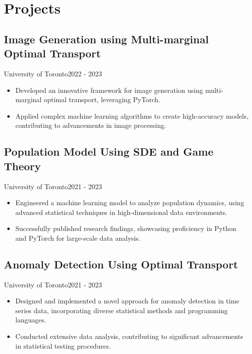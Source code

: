\section{Projects}
\subsection{Image Generation using Multi-marginal Optimal Transport}{University of Toronto}{2022 - 2023}
\begin{itemize}[leftmargin=*]
    \item Developed an innovative framework for image generation using multi-marginal optimal transport, leveraging PyTorch.
    \item Applied complex machine learning algorithms to create high-accuracy models, contributing to advancements in image processing.
\end{itemize}
\subsection{Population Model Using SDE and Game Theory}{University of Toronto}{2021 - 2023}
\begin{itemize}[leftmargin=*]
    \item Engineered a machine learning model to analyze population dynamics, using advanced statistical techniques in high-dimensional data environments.
    \item Successfully published research findings, showcasing proficiency in Python and PyTorch for large-scale data analysis.
\end{itemize}
\subsection{Anomaly Detection Using Optimal Transport}{University of Toronto}{2021 - 2023}
\begin{itemize}[leftmargin=*]
    \item Designed and implemented a novel approach for anomaly detection in time series data, incorporating diverse statistical methods and programming languages.
    \item Conducted extensive data analysis, contributing to significant advancements in statistical testing procedures.
\end{itemize}

